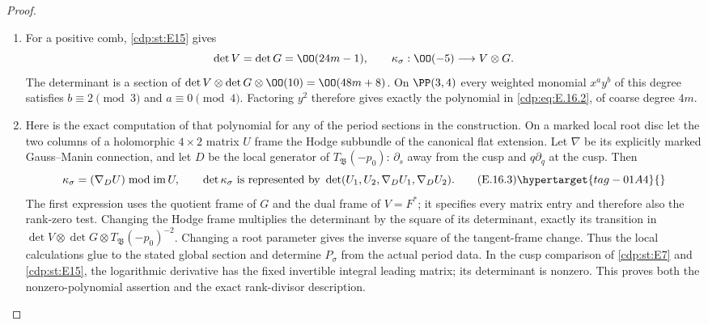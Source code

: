 \begin{proof}
\begin{enumerate}[label={$\langle1\rangle$\arabic*.},leftmargin=*]
\item For a positive comb, \ref{cdp:st:E15} gives
\[
 \det V=\det G=\OO(24m-1),\qquad
 \kappa_\sigma:\OO(-5)\longrightarrow V\otimes G.
\]
The determinant is a section of $\det V\otimes\det G\otimes\OO(10)=\OO(48m+8)$. On $\PP(3,4)$ every weighted monomial $x^ay^b$ of this degree satisfies $b\equiv2\pmod3$ and $a\equiv0\pmod4$. Factoring $y^2$ therefore gives exactly the polynomial in \eqref{cdp:eq:E.16.2}, of coarse degree $4m$.

\item Here is the exact computation of that polynomial for any of the period sections in the construction. On a marked local root disc let the two columns of a holomorphic $4\times2$ matrix $U$ frame the Hodge subbundle of the canonical flat extension. Let $\nabla$ be its explicitly marked Gauss--Manin connection, and let $D$ be the local generator of $T_{\mathfrak B}(-p_0)$: $\partial_s$ away from the cusp and $q\partial_q$ at the cusp. Then
\[
 \kappa_\sigma=(\nabla_DU)\bmod\operatorname{im}U,
 \qquad
 \det\kappa_\sigma\ \text{is represented by}\
 \det(U_1,U_2,\nabla_DU_1,\nabla_DU_2).              \tag{E.16.3}\hypertarget{tag-01A4}{}\label{cdp:eq:E.16.3}
\]
The first expression uses the quotient frame of $G$ and the dual frame of $V=F^*$; it specifies every matrix entry and therefore also the rank-zero test. Changing the Hodge frame multiplies the determinant by the square of its determinant, exactly its transition in $\det V\otimes\det G\otimes T_{\mathfrak B}(-p_0)^{-2}$. Changing a root parameter gives the inverse square of the tangent-frame change. Thus the local calculations glue to the stated global section and determine $P_\sigma$ from the actual period data. In the cusp comparison of \ref{cdp:st:E7} and \ref{cdp:st:E15}, the logarithmic derivative has the fixed invertible integral leading matrix; its determinant is nonzero. This proves both the nonzero-polynomial assertion and the exact rank-divisor description.

\end{enumerate}
\end{proof}
